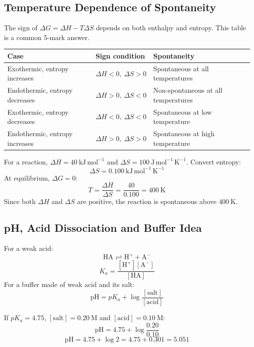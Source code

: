 \documentclass[12pt,a4paper]{article}
\begin{document}
\subsection{Temperature Dependence of Spontaneity}
The sign of $\Delta G=\Delta H-T\Delta S$ depends on both enthalpy and entropy. This table is a common 5-mark answer.

\begin{tabularx}{\linewidth}{|B{3cm}|Y|Y|}
\hline
\textbf{Case} & \textbf{Sign condition} & \textbf{Spontaneity} \\
\hline
Exothermic, entropy increases & $\Delta H<0,\ \Delta S>0$ & Spontaneous at all temperatures \\
\hline
Endothermic, entropy decreases & $\Delta H>0,\ \Delta S<0$ & Non-spontaneous at all temperatures \\
\hline
Exothermic, entropy decreases & $\Delta H<0,\ \Delta S<0$ & Spontaneous at low temperature \\
\hline
Endothermic, entropy increases & $\Delta H>0,\ \Delta S>0$ & Spontaneous at high temperature \\
\hline
\end{tabularx}

\begin{tcolorbox}[examplebox, title={Solved Example: Temperature of Spontaneity}]
For a reaction, $\Delta H=40\ \mathrm{kJ\,mol^{-1}}$ and $\Delta S=100\ \mathrm{J\,mol^{-1}\,K^{-1}}$.
Convert entropy:
\[
\Delta S=0.100\ \mathrm{kJ\,mol^{-1}\,K^{-1}}
\]
At equilibrium, $\Delta G=0$:
\[
T=\frac{\Delta H}{\Delta S}=\frac{40}{0.100}=400\ \mathrm{K}
\]
Since both $\Delta H$ and $\Delta S$ are positive, the reaction is spontaneous above $400\ \mathrm{K}$.
\end{tcolorbox}

\subsection{pH, Acid Dissociation and Buffer Idea}
For a weak acid:
\[
\mathrm{HA\rightleftharpoons H^+ + A^-}
\]
\[
K_a=\frac{[\mathrm{H^+}][\mathrm{A^-}]}{[\mathrm{HA}]}
\]
For a buffer made of weak acid and its salt:
\[
\mathrm{pH}=pK_a+\log\frac{[\mathrm{salt}]}{[\mathrm{acid}]}
\]

\begin{tcolorbox}[examplebox, title={Solved Example: Buffer pH}]
If $pK_a=4.75$, $[\mathrm{salt}]=0.20\ \mathrm{M}$ and $[\mathrm{acid}]=0.10\ \mathrm{M}$:
\[
\mathrm{pH}=4.75+\log\frac{0.20}{0.10}
\]
\[
\mathrm{pH}=4.75+\log2=4.75+0.301=5.051
\]
\end{tcolorbox}
\end{document}
